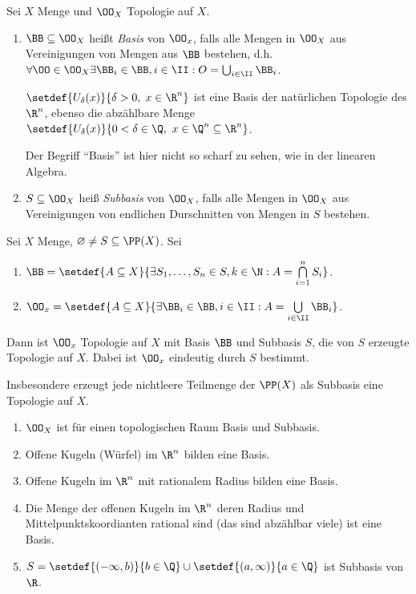 \begin{defn}
\label{defn:1.1.7}
Sei $X$ Menge und $\OO_X$ Topologie auf $X$.
\begin{enumerate}
  \item $\BB \subseteq \OO_X$ heißt \emph{Basis} von $\OO_x$, falls alle Mengen
  in $\OO_X$ aus Vereinigungen von Mengen aus $\BB$ bestehen, d.h. $\forall
  \OO\in\OO_X \exists \BB_i\in \BB, i\in\II : O = \bigcup_{i\in\II} \BB_i$.
  \begin{bspn}
  $\setdef{U_\delta(x)}{\delta > 0,\;x\in\R^n}$ ist eine Basis der
  natürlichen Topologie des $\R^n$, ebenso die abzählbare Menge
  $\setdef{U_\delta(x)}{0<\delta\in\Q,\ x\in\Q^n\subseteq\R^n}$.\bsphere
  \end{bspn}
  Der Begriff ``Basis'' ist hier nicht so scharf zu sehen, wie in der linearen
  Algebra.
  \item $S\subseteq \OO_X$ heiß \emph{Subbasis} von $\OO_X$, falls alle Mengen
  in $\OO_X$ aus Vereinigungen von endlichen Durschnitten von Mengen in $S$
  bestehen.\fishhere
\end{enumerate}
\end{defn}

\begin{prop}
\label{prop:1.1.8}
Sei $X$ Menge, $\varnothing\neq S\subseteq \PP(X)$. Sei
\begin{enumerate}
  \item $\BB = \setdef{A\subseteq X}{\exists S_1,\ldots,S_n\in S,k\in\N : A =
  \bigcap\limits_{i=1}^n S_i}$.
  \item $\OO_x = \setdef{A\subseteq X}{\exists \BB_i\in\BB, i\in\II : A =
  \bigcup\limits_{i\in\II} \BB_i}$.
\end{enumerate}
Dann ist $\OO_x$ Topologie auf $X$ mit Basis $\BB$ und Subbasis $S$, die von
$S$ erzeugte Topologie auf $X$. Dabei ist $\OO_x$ eindeutig durch $S$
bestimmt.\fishhere
\end{prop}

Insbesondere erzeugt jede nichtleere Teilmenge der $\PP(X)$ als Subbasis eine
Topologie auf $X$.

\begin{bspn}
\begin{enumerate}[label=\arabic{*}.)]
  \item $\OO_X$ ist für einen topologischen Raum Basis und Subbasis.
  \item Offene Kugeln (Würfel) im $\R^n$ bilden eine Basis.
  \item Offene Kugeln im $\R^n$ mit rationalem Radius bilden eine Basis.
  \item Die Menge der offenen Kugeln im $\R^n$ deren Radius und
  Mittelpunktskoordianten rational sind (das sind abzählbar viele) ist eine
  Basis.
  \item $S = \setdef{(-\infty,b)}{b\in\Q}\cup \setdef{(a,\infty)}{a\in\Q}$ ist
  Subbasis von $\R$.\bsphere
\end{enumerate}
\end{bspn}

